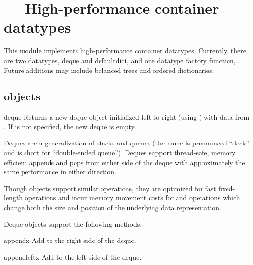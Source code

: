 \section{ ---
         High-performance container datatypes}



This module implements high-performance container datatypes.  Currently,
there are two datatypes, deque and defaultdict, and one datatype factory
function, .
Future additions may include balanced trees and ordered dictionaries.

\subsection{ objects \label{deque-objects}}

\begin{classdesc}{deque}{}
  Returns a new deque object initialized left-to-right (using
  ) with data from .  If 
  is not specified, the new deque is empty.

  Deques are a generalization of stacks and queues (the name is pronounced
  ``deck'' and is short for ``double-ended queue'').  Deques support
  thread-safe, memory efficient appends and pops from either side of the deque
  with approximately the same  performance in either direction.

  Though  objects support similar operations, they are optimized
  for fast fixed-length operations and incur  memory movement costs
  for  and  operations which change both the
  size and position of the underlying data representation.
\end{classdesc}

Deque objects support the following methods:

\begin{methoddesc}{append}{x}
   Add  to the right side of the deque.
\end{methoddesc}

\begin{methoddesc}{appendleft}{x}
   Add  to the left side of the deque.
\end{methoddesc}

